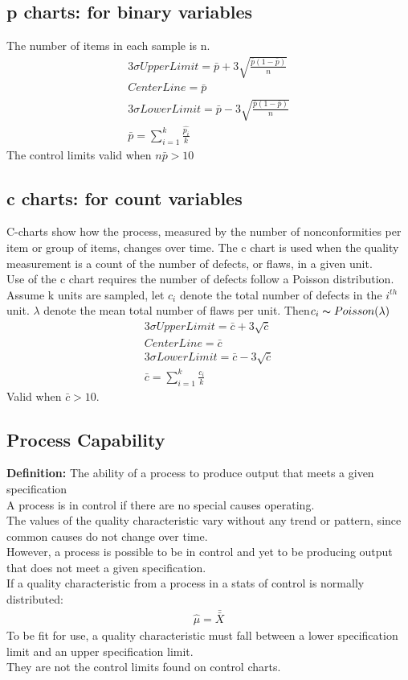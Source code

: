 \documentclass[../main.tex]{subfiles}
\begin{document}
\subsection{p charts: for binary variables}
The number of items in each sample is n.\\
\begin{align*}
    3\sigma UpperLimit = \bar p + 3\sqrt{\frac{\bar p (1-\bar p)}{n}}\\
    CenterLine=\bar{p}\\
    3\sigma LowerLimit = \bar p - 3\sqrt{\frac{\bar p (1-\bar p)}{n}}\\
    \bar p = \sum_{i=1}^{k}\frac{\hat{p_i}}{k}
\end{align*}
The control limits valid when $n\bar p >10$

\subsection{c charts: for count variables}
C-charts show how the process, measured by the number of nonconformities per item or group of items, changes over time.
The c chart is used when the quality measurement is a count of the number of defects, or flaws, in a given unit.\\
Use of the c chart requires the number of defects follow a Poisson distribution.\\
Assume k units are sampled, let $c_i$ denote the total number of defects in the $i^{th}$ unit.
$\lambda$ denote the mean total number of flaws per unit.
Then$c_i \thicksim Poisson(\lambda)$\\
\begin{align*}
    3\sigma UpperLimit = \bar c + 3\sqrt{\bar{c}}\\
    CenterLine=\bar{c}\\
    3\sigma LowerLimit = \bar c - 3\sqrt{\bar{c}}\\
    \bar{c} = \sum_{i=1}^{k} \frac{c_i}{k}
\end{align*}
Valid when $\bar c > 10$.

\subsection{Process Capability}
\textbf{Definition: }The ability of a process to produce output that meets a given specification\\
A process is in control if there are no special causes operating.\\
The values of the quality characteristic vary without any trend or pattern, since common causes do not change over time.\\
However, a process is possible to be in control and yet to be producing output that does not meet a given specification.\\
If a quality characteristic from a process in a stats of control is normally distributed:
\begin{align*}
    \hat{\mu} = \bar{\bar X}
\end{align*}
To be fit for use, a quality characteristic must fall between a lower specification limit and an upper specification limit.\\
They are not the control limits found on control charts.
\end{document}
